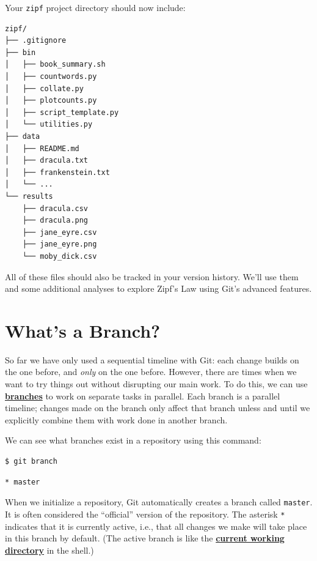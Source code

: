 \documentclass[
]{krantz}
\newcommand{\gref}[2]{\hyperlink{#2}{\textbf{#1}}}
\begin{document}
Your \texttt{zipf} project directory should now include:

\begin{verbatim}
zipf/
├── .gitignore
├── bin
│   ├── book_summary.sh
│   ├── countwords.py
│   ├── collate.py
│   ├── plotcounts.py
│   ├── script_template.py
│   └── utilities.py
├── data
│   ├── README.md
│   ├── dracula.txt
│   ├── frankenstein.txt
│   └── ...
└── results
    ├── dracula.csv
    ├── dracula.png
    ├── jane_eyre.csv
    ├── jane_eyre.png
    └── moby_dick.csv
\end{verbatim}

All of these files should also be tracked in your version history.
We'll use them and some additional analyses to explore Zipf's Law
using Git's advanced features.

\hypertarget{git-advanced-branch-what}{%
\section{What's a Branch?}\label{git-advanced-branch-what}}

So far we have only used a sequential timeline with Git:
each change builds on the one before,
and \emph{only} on the one before.
However,
there are times when we want to try things out
without disrupting our main work.
To do this, we can use \gref{branches}{git\_branch} to work on separate tasks in parallel.
Each branch is a parallel timeline;
changes made on the branch only affect that branch
unless and until we explicitly combine them with work done in another branch.

We can see what branches exist in a repository using this command:

\begin{verbatim}
$ git branch
\end{verbatim}

\begin{verbatim}
* master
\end{verbatim}

When we initialize a repository,
Git automatically creates a branch called \texttt{master}.
It is often considered the ``official'' version of the repository.
The asterisk \texttt{*} indicates that it is currently active,
i.e.,
that all changes we make will take place in this branch by default.
(The active branch is like the \gref{current working directory}{current\_working\_directory} in the shell.)
\end{document}
